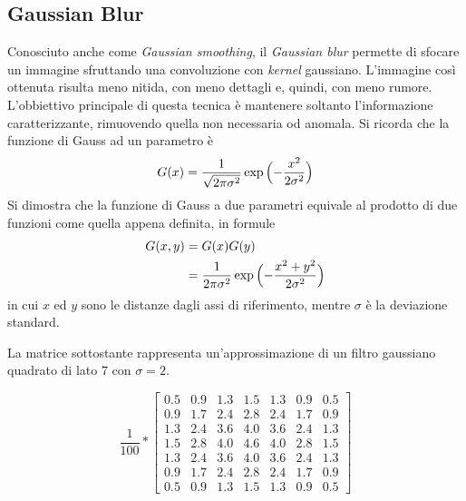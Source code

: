 \clearpage
\subsection {Gaussian Blur}
Conosciuto anche come \textit{Gaussian smoothing}, il \textit{Gaussian blur} permette di sfocare un immagine sfruttando una convoluzione con \textit{kernel} gaussiano.
L'immagine così ottenuta risulta meno nitida, con meno dettagli e, quindi, con meno rumore.
L'obbiettivo principale di questa tecnica è mantenere soltanto l'informazione caratterizzante, rimuovendo quella non necessaria od anomala.
Si ricorda che la funzione di Gauss ad un parametro è
\begin{equation*}
  G(x) = \frac{1}{\sqrt{2\pi\sigma^2}}
         \exp{\Bigl(- \frac{ x^2 }{ 2 \sigma^2 } \Bigr)} 
\end{equation*}
Si dimostra che la funzione di Gauss a due parametri equivale al prodotto di due funzioni come quella appena definita, in formule
\begin{equation*}
  \begin{split}
    G(x,y) & = G(x)G(y) \\
           & = \frac{1}{2\pi\sigma^2}
               \exp{\Bigl(- \frac{ x^2 + y^2 }{ 2 \sigma^2 } \Bigr)} 
  \end{split}
\end{equation*}
in cui $x$ ed $y$ sono le distanze dagli assi di riferimento, mentre $\sigma$ è la deviazione standard.
% 
% 

La matrice sottostante rappresenta un'approssimazione di un filtro gaussiano quadrato di lato $7$ con $\sigma = 2$.

\begin{equation*} %
  \frac{1}{100}*
  \begin{bmatrix}

    0.5 & 0.9 & 1.3 & 1.5 & 1.3 & 0.9 & 0.5\\
    0.9 & 1.7 & 2.4 & 2.8 & 2.4 & 1.7 & 0.9\\
    1.3 & 2.4 & 3.6 & 4.0 & 3.6 & 2.4 & 1.3\\
    1.5 & 2.8 & 4.0 & 4.6 & 4.0 & 2.8 & 1.5\\
    1.3 & 2.4 & 3.6 & 4.0 & 3.6 & 2.4 & 1.3\\
    0.9 & 1.7 & 2.4 & 2.8 & 2.4 & 1.7 & 0.9\\
    0.5 & 0.9 & 1.3 & 1.5 & 1.3 & 0.9 & 0.5

  \end{bmatrix}
\end{equation*}
\label{eq:gauss_kernel}


